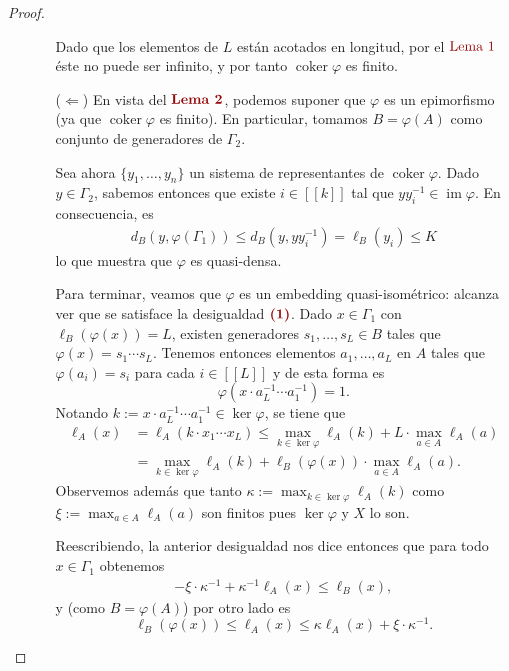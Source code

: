 \documentclass[11pt]{article}
\theoremstyle{colored}
\newcommand{\nat}[1]{[\![#1]\!]}
\newcommand{\im}{\operatorname{im}}
\newcommand{\coker}{\operatorname{coker}}
\newcommand{\paint}[1]{\color{color}{#1}}
\newcommand{\tpaint}[1]{\paint{\textbf{#1}}}
\begin{document}
\begin{proof}
\begin{itemize}[listparindent = \parindent]
\begin{itemize}[listparindent = \parindent]
Dado que los elementos de $L$ están acotados en longitud, por el $\paint{\text{Lema $1$}}$ éste no puede ser infinito, y por tanto $\coker \varphi$ es finito. 
\item[($\Leftarrow$)] En vista del $\tpaint{Lema 2}$, podemos suponer que $\varphi$ es un epimorfismo (ya que $\coker \varphi$ es finito). En particular, tomamos $B = \varphi(A)$ como conjunto de generadores de $\Gamma_2$. 

Sea ahora $\{y_1, \dots, y_n\}$ un sistema de representantes de $\coker \varphi$. Dado $y \in \Gamma_2$, sabemos entonces que existe $i \in \nat{k}$ tal que $yy_i^{-1} \in \im \varphi$. En consecuencia, es
\begin{align*}
d_B(y,\varphi(\Gamma_1)) \leq d_B(y,yy_i^{-1}) = \ell_B(y_i) \leq K
\end{align*}
lo que muestra que $\varphi$ es quasi-densa.

Para terminar, veamos que $\varphi$ es un embedding quasi-isométrico: alcanza ver que se satisface la desigualdad $\tpaint{(1)}$. Dado $x \in \Gamma_1$ con $\ell_B(\varphi(x)) = L$, existen generadores $s_1, \dots, s_L \in B$ tales que $\varphi(x) = s_1 \cdots s_L$. Tenemos entonces elementos $a_1, \dots, a_L$ en $A$ tales que $\varphi(a_i) = s_i$ para cada $i \in \nat{L}$ y de esta forma es
\[
\varphi(x \cdot a_L^{-1} \cdots a_1^{-1}) = 1.
\]
Notando $k := x \cdot a_L^{-1} \cdots a_1^{-1} \in \ker \varphi$, se tiene que
\begin{align*}
\ell_A(x) &= \ell_A(k \cdot x_1 \cdots x_L) \leq \max_{k \in \ker \varphi}\ell_A(k) + L \cdot \max_{a \in A}\ell_A(a)\\ &= \max_{k \in \ker \varphi}\ell_A(k) + \ell_B(\varphi(x)) \cdot \max_{a \in A}\ell_A(a). 
\end{align*}
Observemos  además que tanto $\kappa := \max_{k \in \ker \varphi}\ell_A(k)$ como $\xi := \max_{a \in A}\ell_A(a)$ son finitos pues $\ker \varphi$ y $X$ lo son. 

Reescribiendo, la anterior desigualdad nos dice entonces que para todo $x \in \Gamma_1$ obtenemos  
\begin{align*}
-\xi \cdot \kappa^{-1} + \kappa^{-1} \ell_A(x) \leq \ell_B(x),
\end{align*}
y (como $B = \varphi(A)$) por otro lado es
\[
\ell_B(\varphi(x)) \leq \ell_A(x) \leq \kappa\ell_A(x) + \xi \cdot \kappa^{-1}.
\]
\end{itemize}
\end{itemize}
\end{proof}
\end{document}

